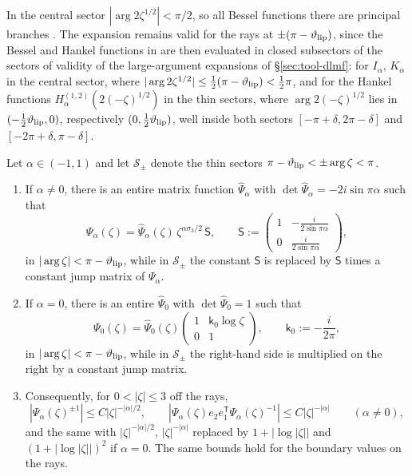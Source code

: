 In the central sector $|\arg2\zeta^{1/2}|<\pi/2$, so all Bessel functions there are principal branches
\cite[\S10.25(ii)]{DLMF}. The expansion \cite[(6.28)]{KMVV} remains valid for the rays at $\pm(\pi-\vartheta_{\mathrm{lip}})$, since the Bessel and
Hankel functions in \cite[(6.23)--(6.25)]{KMVV} are then evaluated in closed subsectors of the sectors of validity of the
large-argument expansions of \S\ref{sec:tool-dlmf}: \cite[(10.40.1)--(10.40.5)]{DLMF} for $I_\alpha$, $K_\alpha$ in the
central sector, where $|\arg2\zeta^{1/2}|\le\frac12(\pi-\vartheta_{\mathrm{lip}})<\frac12\pi$, and \cite[(10.17.5)--(10.17.6)]{DLMF} for
the Hankel functions $H^{(1,2)}_\alpha(2(-\zeta)^{1/2})$ in the thin sectors, where $\arg2(-\zeta)^{1/2}$ lies in
$(-\frac12\vartheta_{\mathrm{lip}},0)$, respectively $(0,\frac12\vartheta_{\mathrm{lip}})$, well inside both sectors $[-\pi+\delta,2\pi-\delta]$ and
$[-2\pi+\delta,\pi-\delta]$.

\begin{lemma}\label{lem:bessel-local}
Let $\alpha\in(-1,1)$ and let $\mathcal S_\pm$ denote the thin sectors $\pi-\vartheta_{\mathrm{lip}}<\pm\arg\zeta<\pi$.
\begin{enumerate}
\item[(i)] If $\alpha\ne0$, there is an entire matrix function $\hat\Psi_\alpha$ with $\det\hat\Psi_\alpha=-2i\sin\pi\alpha$
  such that
  \[
    \Psi_\alpha(\zeta)=\hat\Psi_\alpha(\zeta)\,\zeta^{\alpha\sigma_3/2}\,\mathsf S,\qquad
    \mathsf S:=\begin{pmatrix}1&-\frac{i}{2\sin\pi\alpha}\\[1mm]0&\frac{i}{2\sin\pi\alpha}\end{pmatrix},
  \]
  in $|\arg\zeta|<\pi-\vartheta_{\mathrm{lip}}$, while in $\mathcal S_\pm$ the constant $\mathsf S$ is replaced by $\mathsf S$ times
  a constant jump matrix of $\Psi_\alpha$.
\item[(ii)] If $\alpha=0$, there is an entire $\hat\Psi_0$ with $\det\hat\Psi_0=1$ such that
  \[
    \Psi_0(\zeta)=\hat\Psi_0(\zeta)\begin{pmatrix}1&\mathsf k_0\log\zeta\\0&1\end{pmatrix},\qquad \mathsf k_0:=-\frac{i}{2\pi},
  \]
  in $|\arg\zeta|<\pi-\vartheta_{\mathrm{lip}}$, while in $\mathcal S_\pm$ the right-hand side is multiplied on the right by a
  constant jump matrix.
\item[(iii)] Consequently, for $0<|\zeta|\le3$ off the rays,
  \[
    |\Psi_\alpha(\zeta)^{\pm1}|\le C|\zeta|^{-|\alpha|/2},\qquad
    |\Psi_\alpha(\zeta)e_2e_1^{\mathsf T}\Psi_\alpha(\zeta)^{-1}|\le C|\zeta|^{-|\alpha|}\qquad(\alpha\ne0),
  \]
  and the same with $|\zeta|^{-|\alpha|/2}$, $|\zeta|^{-|\alpha|}$ replaced by $1+|\log|\zeta||$ and
  $(1+|\log|\zeta||)^2$ if $\alpha=0$. The same bounds hold for the boundary values on the rays.
\end{enumerate}
\end{lemma}

